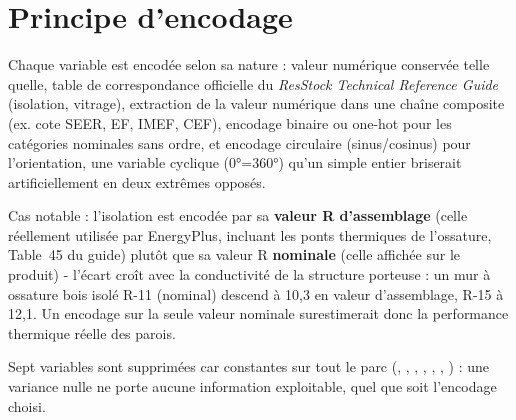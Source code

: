 \section{Principe d'encodage}
\label{sec:principe-encodage}
\begin{resultbox}
Chaque variable  est encodée selon sa nature : valeur numérique conservée telle
quelle, table de correspondance officielle du \emph{ResStock Technical Reference Guide} (isolation,
vitrage), extraction de la valeur numérique dans une chaîne composite (ex. cote SEER, EF, IMEF,
CEF), encodage binaire ou one-hot pour les catégories nominales sans ordre, et encodage circulaire
(sinus/cosinus) pour l'orientation, une variable cyclique (0°=360°) qu'un simple entier
briserait artificiellement en deux extrêmes opposés.

Cas notable : l'isolation est encodée par sa \textbf{valeur R d'assemblage} (celle réellement
utilisée par EnergyPlus, incluant les ponts thermiques de l'ossature, Table~45 du guide) plutôt
que sa valeur R \textbf{nominale} (celle affichée sur le produit) - l'écart croît avec la
conductivité de la structure porteuse : un mur à ossature bois isolé R-11 (nominal) descend à
10,3 en valeur d'assemblage, R-15 à 12,1. Un encodage sur la seule valeur nominale surestimerait
donc la performance thermique réelle des parois.

Sept variables sont supprimées car constantes sur tout le parc (,
, , , , ,
) : une variance nulle ne porte aucune information exploitable, quel que soit
l'encodage choisi.


\end{resultbox}
